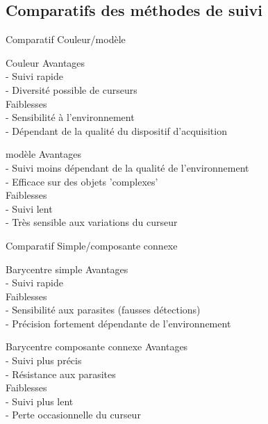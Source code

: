 \documentclass{beamer}
\begin{document}
            \subsection{Comparatifs des méthodes de suivi}
            \begin{frame}{Comparatif Couleur/modèle}
            \pause
                  \begin{block}{Couleur}
                        Avantages \\
                        - Suivi rapide \\
                        - Diversité possible de curseurs \\
                        Faiblesses \\
                        - Sensibilité à l'environnement\\
                        - Dépendant de la qualité du dispositif d'acquisition\\
                  \end{block}
                  \pause
                  \begin{block}{modèle}
                        Avantages \\
                        - Suivi moins dépendant de la qualité de l'environnement \\
                        - Efficace sur des objets 'complexes'\\
                        Faiblesses \\
                        - Suivi lent \\
                        - Très sensible aux variations du curseur\\
                  \end{block}
            \end{frame}
            \begin{frame}{Comparatif Simple/composante connexe}
            \pause
                  \begin{block}{Barycentre simple}
                        Avantages \\
                        - Suivi rapide \\
                        Faiblesses \\
                        - Sensibilité aux parasites (fausses détections)\\
                        - Précision fortement dépendante de l'environnement\\
                  \end{block}
                  \pause
                  \begin{block}{Barycentre composante connexe}
                        Avantages \\
                        - Suivi plus précis \\
                        - Résistance aux parasites \\
                        Faiblesses \\
                        - Suivi plus lent \\
                        - Perte occasionnelle du curseur
                  \end{block}
            \end{frame}
\end{document}
